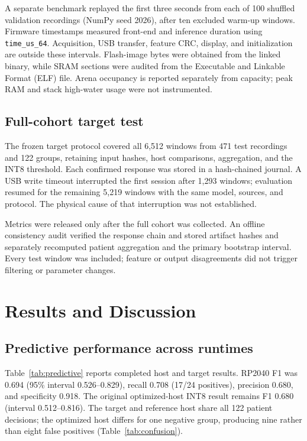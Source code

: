 \documentclass[9pt,twocolumn,twoside,lineno]{MSBJournal}
\begin{document}
A separate benchmark replayed the first three seconds from each of 100 shuffled validation recordings (NumPy seed 2026), after ten excluded warm-up windows. Firmware timestamps measured front-end and inference duration using \texttt{time\_us\_64}. Acquisition, USB transfer, feature CRC, display, and initialization are outside these intervals. Flash-image bytes were obtained from the linked binary, while SRAM sections were audited from the Executable and Linkable Format (ELF) file. Arena occupancy is reported separately from capacity; peak RAM and stack high-water usage were not instrumented.

\subsection{Full-cohort target test}
The frozen target protocol covered all 6,512 windows from 471 test recordings and 122 groups, retaining input hashes, host comparisons, aggregation, and the INT8 threshold. Each confirmed response was stored in a hash-chained journal. A USB write timeout interrupted the first session after 1,293 windows; evaluation resumed for the remaining 5,219 windows with the same model, sources, and protocol. The physical cause of that interruption was not established.

Metrics were released only after the full cohort was collected. An offline consistency audit verified the response chain and stored artifact hashes and separately recomputed patient aggregation and the primary bootstrap interval. Every test window was included; feature or output disagreements did not trigger filtering or parameter changes.

\section{Results and Discussion}
\subsection{Predictive performance across runtimes}
Table~\ref{tab:predictive} reports completed host and target results. RP2040 F1 was 0.694 (95\% interval 0.526--0.829), recall 0.708 (17/24 positives), precision 0.680, and specificity 0.918. The original optimized-host INT8 result remains F1 0.680 (interval 0.512--0.816). The target and reference host share all 122 patient decisions; the optimized host differs for one negative group, producing nine rather than eight false positives (Table~\ref{tab:confusion}).
\end{document}
